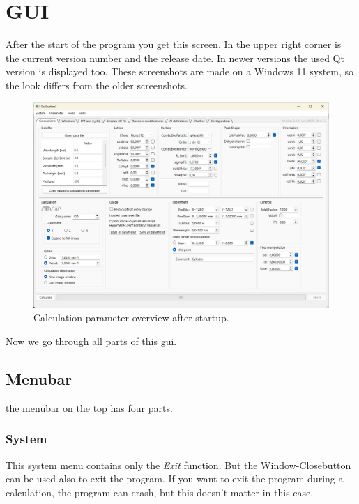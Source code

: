 \documentclass[11pt]{article} %
\begin{document}
\clearpage
\section{GUI}

After the start of the program you get this screen. In the upper right corner is the current version number and the release date. In newer versions the used Qt version is displayed too. These screenshots are made on a Windows 11 system, so the look differs from the older screenshots.

\begin{figure}[H]
 \centering
 \includegraphics[width=\textwidth]{gui-calculations.png}
 \caption{Calculation parameter overview after startup.}
\end{figure}
Now we go through all parts of this gui.


\subsection{Menubar}

the menubar on the top has four parts.

\subsubsection{System}

This system menu contains only the {\it Exit} function. But the Window-Closebutton can be used also to exit the program. If you want to exit the program during a calculation, the program can crash, but this doesn't matter in this case.
\end{document}
